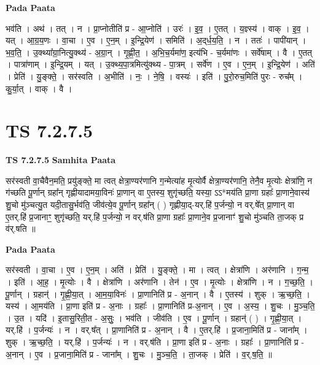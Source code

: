 \documentclass[17pt]{extarticle}
\begin{document}
\textbf{Pada Paata} \newline

भव॑ति । अथ॑ । तत् । न । प्रा॒प्नोतीति॑ प्र - आ॒प्नोति॑ । उरः॑ । इ॒व॒ । ए॒तत् । य॒ज्ञ्स्य॑ । वाक् । इ॒व॒ । यत् । आ॒ग्र॒य॒णः । वा॒चा । ए॒व । ए॒न॒म् । इ॒न्द्रि॒येण॑ । समिति॑ । अ॒द्‌र्ध॒य॒ति॒ । न । ततः॑ । पापी॑यान् । भ॒व॒ति॒ । उ॒क्थ्या᳚ग्रा॒नित्यु॒क्थ्य॑ - अ॒ग्रा॒न् । गृ॒ह्णी॒त॒ । अ॒भि॒च॒र्यमा॑ण॒ इत्य॑भि - च॒र्यमा॑णः । सर्वे॑षाम् । वै । ए॒तत् । पात्रा॑णाम् । इ॒न्द्रि॒यम् । यत् । उ॒क्थ्य॒पा॒त्रमित्यु॑क्थ्य - पा॒त्रम् । सर्वे॑ण । ए॒व । ए॒न॒म् । इ॒न्द्रि॒येण॑ । अति॑ । प्रेति॑ । यु॒ङ्क्ते॒ । सर॑स्वति । अ॒भीति॑ । नः॒ । ने॒षि॒ । वस्यः॑ । इति॑ । पु॒रो॒रुच॒मिति॑ पुरः - रुच᳚म् । कु॒र्या॒त् । वाक् । वै ।  \newline




\section*{ TS 7.2.7.5 }

\textbf{TS 7.2.7.5 } \newline
\textbf{Samhita Paata} \newline

सर॑स्वती वा॒चैवैन॒मति॒ प्रयु॑ङ्क्ते॒ मा त्वत् क्षेत्रा॒ण्यर॑णानि ग॒न्मेत्या॑ह मृ॒त्योर्वै क्षेत्रा॒ण्यर॑णानि॒ तेनै॒व मृ॒त्योः क्षेत्रा॑णि॒ न ग॑च्छति पू॒र्णान् ग्रहा᳚न् गृह्णीयादामया॒विनः॑ प्रा॒णान् वा ए॒तस्य॒ शुगृ॑च्छति॒ यस्या॒ ऽऽ*मय॑ति प्रा॒णा ग्रहाः᳚ प्रा॒णाने॒वास्य॑ शु॒चो मु॑ञ्चत्यु॒त यदी॒तासु॒र्भव॑ति॒ जीव॑त्ये॒व पू॒र्णान् ग्रहा᳚न् ( ) गृह्णीया॒द्-यर्.हि॑ प॒र्जन्यो॒ न वर्.षे᳚त् प्रा॒णान् वा ए॒तर्.हि॑ प्र॒जानाꣳ॒॒ शुगृ॑च्छति॒ यर्.हि॑ प॒र्जन्यो॒ न वर्.ष॑ति प्रा॒णा ग्रहाः᳚ प्रा॒णाने॒व प्र॒जानाꣳ॑ शु॒चो मु॑ञ्चति ता॒जक् प्र व॑र्.षति ॥ \newline

\textbf{Pada Paata} \newline

सर॑स्वती । वा॒चा । ए॒व । ए॒न॒म् । अति॑ । प्रेति॑ । यु॒ङ्क्ते॒ । मा । त्वत् । क्षेत्रा॑णि । अर॑णानि । ग॒न्म॒ । इति॑ । आ॒ह॒ । मृ॒त्योः । वै । क्षेत्रा॑णि । अर॑णानि । तेन॑ । ए॒व । मृ॒त्योः । क्षेत्रा॑णि । न । ग॒च्छ॒ति॒ । पू॒र्णान् । ग्रहान्॑ । गृ॒ह्णी॒या॒त् । आ॒म॒या॒विनः॑ । प्रा॒णानिति॑ प्र - अ॒नान् । वै । ए॒तस्य॑ । शुक् । ऋ॒च्छ॒ति॒ । यस्य॑ । आ॒मय॑ति । प्रा॒णा इति॑ प्र - अ॒नाः । ग्रहाः᳚ । प्रा॒णानिति॑ प्र-अ॒नान् । ए॒व । अ॒स्य॒ । शु॒चः । मु॒ञ्च॒ति॒ । उ॒त । यदि॑ । इ॒तासु॒रिती॒त - अ॒सुः॒ । भव॑ति । जीव॑ति । ए॒व । पू॒र्णान् । ग्रहान्॑ ( ) । गृ॒ह्णी॒या॒त् । यर्.हि॑ । प॒र्जन्यः॑ । न । वर्.ष᳚त् । प्रा॒णानिति॑ प्र - अ॒नान् । वै । ए॒तर्.हि॑ । प्र॒जाना॒मिति॑ प्र - जाना᳚म् । शुक् । ऋ॒च्छ॒ति॒ । यर्.हि॑ । प॒र्जन्यः॑ । न । वर्.ष॑ति । प्रा॒णा इति॑ प्र - अ॒नाः । ग्रहाः᳚ । प्रा॒णानिति॑ प्र - अ॒नान् । ए॒व । प्र॒जाना॒मिति॑ प्र - जाना᳚म् । शु॒चः । मु॒ञ्च॒ति॒ । ता॒जक् । प्रेति॑ । व॒र्.ष॒ति॒ ॥  \newline
\end{document}
